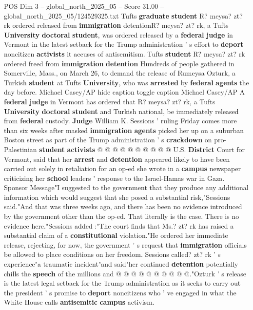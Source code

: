 \begin{textsample}{POS Dim 3 – global\_north\_2025\_05 – Score 31.00 – global\_north\_2025\_05/124529325.txt}  \label{ex:f3_pos_129}
Tufts \textbf{graduate} \textbf{student} R? meysa? zt? rk ordered released from \textbf{immigration} detentionR? meysa? zt? rk, a Tufts \textbf{University} \textbf{doctoral} \textbf{student}, was ordered released by a \textbf{federal} \textbf{judge} in Vermont in the latest setback for the Trump administration ' s effort to \textbf{deport} noncitizen \textbf{activists} it accuses of antisemitism.
Tufts \textbf{student} R? meysa? zt? rk ordered freed from \textbf{immigration} \textbf{detention} Hundreds of people gathered in Somerville, Mass., on March 26, to demand the release of Rumeysa Ozturk, a Turkish \textbf{student} at Tufts \textbf{University}, who was \textbf{arrested} by \textbf{federal} \textbf{agents} the day before.
Michael Casey/AP hide caption toggle caption Michael Casey/AP A \textbf{federal} \textbf{judge} in Vermont has ordered that R? meysa? zt? rk, a Tufts \textbf{University} \textbf{doctoral} \textbf{student} and Turkish national, be immediately released from \textbf{federal} custody. \textbf{Judge} William K.
Sessions ' ruling Friday comes more than six weeks after masked \textbf{immigration} \textbf{agents} picked her up on a suburban Boston street as part of the Trump administration ' s \textbf{crackdown} on pro-Palestinian \textbf{student} \textbf{activists} @ @ @ @ @ @ @ @ @ @ U.S. \textbf{District} Court for Vermont, said that her \textbf{arrest} and \textbf{detention} appeared likely to have been carried out solely in retaliation for an op-ed she wrote in a \textbf{campus} newspaper criticizing her \textbf{school} leaders ' response to the Israel-Hamas war in Gaza.
Sponsor Message"I suggested to the government that they produce any additional information which would suggest that she posed a substantial risk,"Sessions said."And that was three weeks ago, and there has been no evidence introduced by the government other than the op-ed.
That literally is the case.
There is no evidence here."Sessions added :"The court finds that Ms.? zt? rk has raised a substantial claim of a \textbf{constitutional} violation."He ordered her immediate release, rejecting, for now, the government ' s request that \textbf{immigration} officials be allowed to place conditions on her freedom.
Sessions called? zt? rk ' s experience"a traumatic incident"and said"her continued \textbf{detention} potentially chills the \textbf{speech} of the millions and @ @ @ @ @ @ @ @ @ @."Ozturk ' s release is the latest legal setback for the Trump administration as it seeks to carry out the president ' s promise to \textbf{deport} noncitizens who ' ve engaged in what the White House calls \textbf{antisemitic} \textbf{campus} activism.

\end{textsample}
